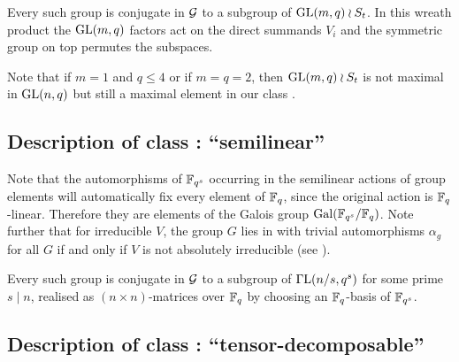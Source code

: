 
\stru
Every such group is conjugate in $\mathcal{G}$ to a subgroup of $\GL(m,q) \wr S_t$.
In this wreath product the $\GL(m,q)$ factors act on the direct summands
$V_i$ and the symmetric group on top permutes the subspaces.

Note that if $m = 1$ and $q \le 4$ or if $m=q=2$, then $\GL(m,q) \wr S_t$
is not maximal in $\GL(n,q)$ but still a maximal element in our class
.

\subsection{Description of class : ``semilinear''}
\label{descC3}


Note that the automorphisms of $\mathbb{F}_{q^s}$ occurring in the semilinear
actions of group elements will automatically fix every element of $\mathbb{F}_q$, 
since the original action is $\mathbb{F}_q$-linear. Therefore they are elements of
the Galois group $\Gal(\F_{q^s}/\F_q)$. Note further that for irreducible
$V$, the group $G$ lies in  
with trivial automorphisms $\alpha_g$ for all $G$ if and only if
$V$ is not absolutely irreducible (see \cite[(29.13)]{CR0}).

\medskip
\stru
Every such group is conjugate in $\mathcal{G}$ to a subgroup of $\GGL(n/s,q^s)$
for some prime $s \mid n$, 
realised as $(n \times n)$-matrices over $\mathbb{F}_q$ by choosing an 
$\mathbb{F}_q$-basis of $\mathbb{F}_{q^s}$.

\subsection{Description of class : ``tensor-decomposable''}
\label{descC4}

